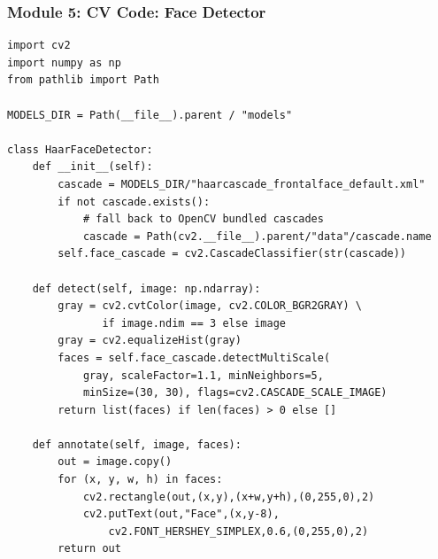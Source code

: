 \begin{frame}[fragile]\frametitle{Module 5: CV Code: Face Detector}
\begin{lstlisting}
import cv2
import numpy as np
from pathlib import Path

MODELS_DIR = Path(__file__).parent / "models"

class HaarFaceDetector:
    def __init__(self):
        cascade = MODELS_DIR/"haarcascade_frontalface_default.xml"
        if not cascade.exists():
            # fall back to OpenCV bundled cascades
            cascade = Path(cv2.__file__).parent/"data"/cascade.name
        self.face_cascade = cv2.CascadeClassifier(str(cascade))

    def detect(self, image: np.ndarray):
        gray = cv2.cvtColor(image, cv2.COLOR_BGR2GRAY) \
               if image.ndim == 3 else image
        gray = cv2.equalizeHist(gray)
        faces = self.face_cascade.detectMultiScale(
            gray, scaleFactor=1.1, minNeighbors=5,
            minSize=(30, 30), flags=cv2.CASCADE_SCALE_IMAGE)
        return list(faces) if len(faces) > 0 else []

    def annotate(self, image, faces):
        out = image.copy()
        for (x, y, w, h) in faces:
            cv2.rectangle(out,(x,y),(x+w,y+h),(0,255,0),2)
            cv2.putText(out,"Face",(x,y-8),
                cv2.FONT_HERSHEY_SIMPLEX,0.6,(0,255,0),2)
        return out
\end{lstlisting}
\end{frame}

